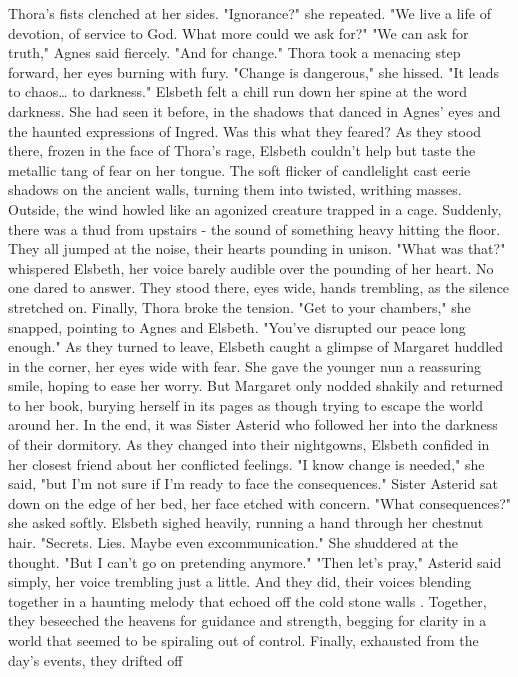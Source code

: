 \documentclass[11pt]{article}
\begin{document}
Thora's fists clenched at her sides. "Ignorance?" she repeated. "We live a life of devotion, of service to God. What more could we ask for?"
"We can ask for truth," Agnes said fiercely. "And for change."
Thora took a menacing step forward, her eyes burning with fury. "Change is dangerous," she hissed. "It leads to chaos\ldots{} to darkness."
Elsbeth felt a chill run down her spine at the word darkness. She had seen it before, in the shadows that danced in Agnes' eyes and the haunted expressions of Ingred. Was this what they feared?
As they stood there, frozen in the face of Thora's rage, Elsbeth couldn't help but taste the metallic tang of fear on her tongue. The soft flicker of candlelight cast eerie shadows on the ancient walls, turning them into twisted, writhing masses. Outside, the wind howled like an agonized creature trapped in a cage. Suddenly, there was a thud from upstairs - the sound of something heavy hitting the floor. They all jumped at the noise, their hearts pounding in unison.
"What was that?" whispered Elsbeth, her voice barely audible over the pounding of her heart.
No one dared to answer. They stood there, eyes wide, hands trembling, as the silence stretched on. Finally, Thora broke the tension. "Get to your chambers," she snapped, pointing to Agnes and Elsbeth. "You've disrupted our peace long enough."
As they turned to leave, Elsbeth caught a glimpse of Margaret huddled in the corner, her eyes wide with fear. She gave the younger nun a reassuring smile, hoping to ease her worry. But Margaret only nodded shakily and returned to her book, burying herself in its pages as though trying to escape the world around her.
In the end, it was Sister Asterid who followed her into the darkness of their dormitory. As they changed into their nightgowns, Elsbeth confided in her closest friend about her conflicted feelings. "I know change is needed," she said, "but I'm not sure if I'm ready to face the consequences."
Sister Asterid sat down on the edge of her bed, her face etched with concern. "What consequences?" she asked softly.
Elsbeth sighed heavily, running a hand through her chestnut hair. "Secrets. Lies. Maybe even excommunication." She shuddered at the thought. "But I can't go on pretending anymore."
"Then let's pray," Asterid said simply, her voice trembling just a little. And they did, their voices blending together in a haunting melody that echoed off the cold stone walls . Together, they beseeched the heavens for guidance and strength, begging for clarity in a world that seemed to be spiraling out of control.
Finally, exhausted from the day's events, they drifted off
\end{document}
